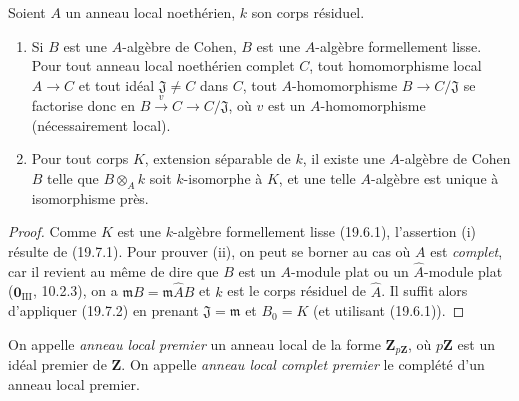 
\begin{theorem}[19.8.2]
\label{0.19.8.2-fr}
Soient $A$ un anneau local noethérien, $k$ son corps résiduel.
\begin{enumerate}
  \item[(i)] Si $B$ est une $A$-algèbre de Cohen, $B$ est une $A$-algèbre
  formellement lisse. Pour tout anneau local noethérien complet $C$, tout
  homomorphisme local $A\to C$ et tout idéal $\mathfrak J\neq C$ dans $C$,
  tout $A$-homomorphisme $B\to C/\mathfrak J$ se factorise donc en
  $B\xrightarrow{v}C\to C/\mathfrak J$, où $v$ est un $A$-homomorphisme
  (nécessairement local).
  \item[(ii)] Pour tout corps $K$, extension séparable de $k$, il existe une
  $A$-algèbre de Cohen $B$ telle que $B\otimes_A k$ soit $k$-isomorphe à $K$,
  et une telle $A$-algèbre est unique à isomorphisme près.
\end{enumerate}
\end{theorem}

\begin{proof}
Comme $K$ est une $k$-algèbre formellement lisse (19.6.1), l'assertion (i)
résulte de (19.7.1). Pour prouver (ii), on peut se borner au cas où $A$ est
\emph{complet}, car il revient au même de dire que $B$ est un $A$-module plat
ou un $\widehat A$-module plat ($\mathbf 0_{\mathrm{III}}$, 10.2.3), on a
$\mathfrak mB=\mathfrak m\widehat AB$ et $k$ est le corps résiduel de
$\widehat A$. Il suffit alors d'appliquer (19.7.2) en prenant
$\mathfrak J=\mathfrak m$ et $B_0=K$ (et utilisant (19.6.1)).
\end{proof}

\begin{definition}[19.8.3]
\label{0.19.8.3-fr}
On appelle \emph{anneau local premier} un anneau local de la forme
$\mathbf Z_{p\mathbf Z}$, où $p\mathbf Z$ est un idéal premier de $\mathbf Z$.
On appelle \emph{anneau local complet premier} le complété d'un anneau local
premier.
\end{definition}

